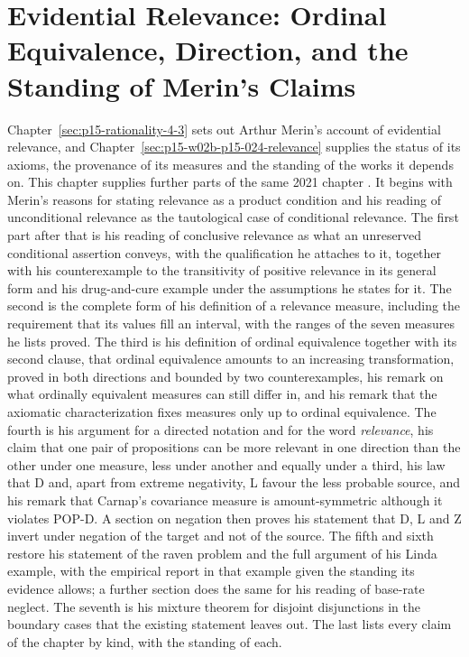 \chapter{Evidential Relevance: Ordinal Equivalence, Direction, and the Standing of Merin's Claims}
\label{sec:p15-w02c-p15-027-relevance}

Chapter~\ref{sec:p15-rationality-4-3} sets out Arthur Merin's account of
evidential relevance, and Chapter~\ref{sec:p15-w02b-p15-024-relevance}
supplies the status of its axioms, the provenance of its measures and the
standing of the works it depends on. This chapter supplies further
parts of the same 2021 chapter \cite[pp.~265--275]{Merin2021Relevance}.
It begins with Merin's reasons for stating relevance as a product
condition and his reading of unconditional relevance as the tautological
case of conditional relevance. The first part after that is his reading of conclusive relevance as what an
unreserved conditional assertion conveys, with the qualification he
attaches to it, together with his counterexample to the transitivity of
positive relevance in its general form and his drug-and-cure example
under the assumptions he states for it. The second is the complete form
of his definition of a relevance measure, including the requirement that
its values fill an interval, with the ranges of the seven measures he
lists proved. The third is his definition of ordinal equivalence together
with its second clause, that ordinal equivalence amounts to an increasing
transformation, proved in both directions and bounded by two
counterexamples, his remark on what ordinally equivalent measures can
still differ in, and his remark that the axiomatic characterization fixes
measures only up to ordinal equivalence. The fourth is his argument for a
directed notation and for the word \emph{relevance}, his claim that one
pair of propositions can be more relevant in one direction than the other
under one measure, less under another and equally under a third, his
law that D and, apart from extreme negativity, L favour the less
probable source, and his remark that Carnap's covariance measure is
amount-symmetric although it violates POP-D. A section on negation then
proves his statement that D, L and Z invert under negation of the target
and not of the source. The fifth and sixth restore his statement of the raven
problem and the full argument of his Linda example, with the empirical
report in that example given the standing its evidence allows; a further
section does the same for his reading of base-rate neglect. The seventh
is his mixture theorem for
disjoint disjunctions in the boundary cases that the existing statement
leaves out. The last lists every claim of the chapter by kind, with the
standing of each.

